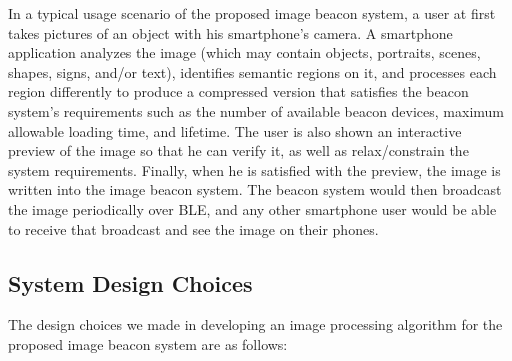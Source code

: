 In a typical usage scenario of the proposed image beacon system, a user at first takes pictures of an object with his smartphone's camera. A smartphone application analyzes the image (which may contain objects, portraits, scenes, shapes, signs, and/or text), identifies semantic regions on it, and processes each region differently to produce a compressed version that satisfies the beacon system's requirements such as the number of available beacon devices, maximum allowable loading time, and lifetime. The user is also shown an interactive preview of the image so that he can verify it, as well as relax/constrain the system requirements. Finally, when he is satisfied with the preview, the image is written into the image beacon system. The beacon system would then broadcast the image periodically over BLE, and any other smartphone user would be able to receive that broadcast and see the image on their phones.


\subsection{System Design Choices}

The design choices we made in developing an image processing algorithm for the proposed image beacon system are as follows:


 \vspace{.5em}

 \vspace{.5em}


